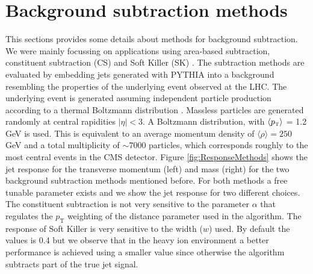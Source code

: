 \newpage
\section{Background subtraction methods}
\label{app:background}

This sections provides some details about methods for background subtraction. We were mainly focussing on applications using area-based subtraction, constituent subtraction (CS) \cite{Berta:2014eza} and Soft Killer (SK) \cite{Cacciari:2014gra}. The subtraction methods are evaluated by embedding jets generated with PYTHIA into a background resembling the properties of the underlying event observed at the LHC. The underlying event is generated assuming independent particle production according to a thermal Boltzmann distribution \cite{deBarros:2012ws}. Massless particles are generated randomly at central rapidities $|\eta|<3$. A Boltzmann distribution, with $\langle p_{\text{\tiny T}} \rangle$ = 1.2 GeV is used. This is equivalent to an average momentum density of $\langle \rho \rangle =250$ GeV and a total multiplicity of $\sim 7000$ particles, which corresponds roughly to the most central events in the CMS detector. Figure \ref{fig:ResponseMethods} shows the jet response for the transverse momentum (left) and mass (right) for the two background subtraction methods mentioned before. For both methods a free tunable parameter exists and we show the jet response for two different choices. The constituent subtraction is not very sensitive to the parameter $\alpha$ that regulates the $p_{\mathrm{T}}$ weighting of the distance parameter used in the algorithm. The response of Soft Killer is very sensitive to the width ($w$) used. By default the values is 0.4 but we observe that in the heavy ion environment a better performance is achieved using a smaller value since otherwise the algorithm subtracts part of the true jet signal.


